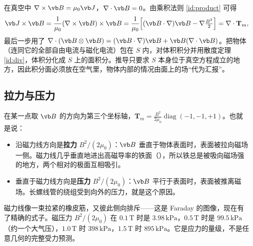 \begin{deeper}[应力张量从哪里来]
在真空中 $\nabla\times\vb B=\mu_0\vb J$，$\nabla\cdot\vb B=0$。由乘积法则 \eqref{id:product} 可得
\begin{equation*}
\vb J\times\vb B=\frac{1}{\mu_0}(\nabla\times\vb B)\times\vb B=\frac{1}{\mu_0}\Bigl[(\vb B\cdot\nabla)\vb B-\nabla\tfrac{B^2}{2}\Bigr]=\nabla\cdot\mathbf T_m ,
\end{equation*}
最后一步用了 $\nabla\cdot(\vb B\otimes\vb B)=(\vb B\cdot\nabla)\vb B+\vb B(\nabla\cdot\vb B)$。把物体（连同它的全部自由电流与磁化电流）包在 $S$ 内，对体积积分并用散度定理 \eqref{id:div}，体积分化成 $S$ 上的面积分。推导只要求 $S$ 本身位于真空方程成立的地方，因此积分面必须放在空气里，物体内部的情况由面上的场“代为汇报”。
\end{deeper}

\subsection{拉力与压力}
在某一点取 $\vb B$ 的方向为第三个坐标轴，$\mathbf T_m=\frac{B^2}{2\mu_0}\operatorname{diag}(-1,-1,+1)$。也就是说：
\begin{itemize}
\item 沿磁力线方向是\textbf{拉力} $B^2/(2\mu_0)$：$\vb B$ 垂直于物体表面时，表面被拉向磁场一侧。磁力线几乎垂直地进出高磁导率的铁面（），所以铁总是被吸向磁场强的地方，两个相对的极面互相吸引。
\item 垂直于磁力线方向是\textbf{压力} $B^2/(2\mu_0)$：$\vb B$ 平行于表面时，表面被推离磁场。长螺线管的绕组受到向外的压力，就是这个原因。
\end{itemize}
磁力线像一束拉紧的橡皮筋，又彼此侧向排斥——这是 Faraday 的图像，现在有了精确的式子。磁压力 $B^2/(2\mu_0)$ 在 $0.1\,\mathrm T$ 时是 $3.98\,\mathrm{kPa}$，$0.5\,\mathrm T$ 时是 $99.5\,\mathrm{kPa}$（约一个大气压），$1.0\,\mathrm T$ 时 $398\,\mathrm{kPa}$，$1.5\,\mathrm T$ 时 $895\,\mathrm{kPa}$。它是应力的量级，不是任意几何的完整受力预测。

